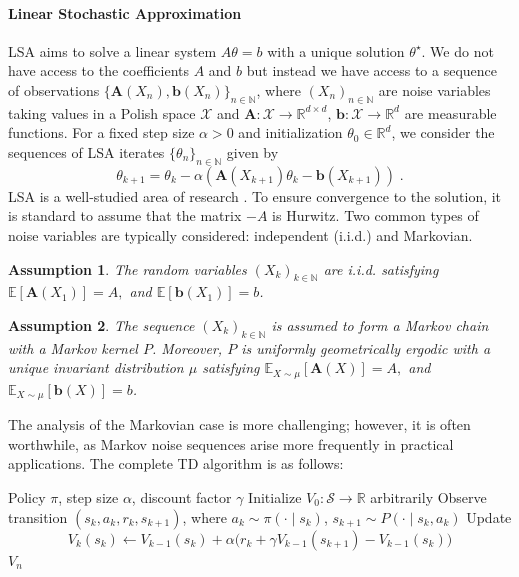 \documentclass{article}
\numberwithin{equation}{section}
\newtheorem{assumption}{Assumption}
\newcommand{\bA}{\mathbf{A}}
\newcommand{\bb}{\mathbf{b}}
\newcommand{\eqsp}{\;}
\begin{document}
\paragraph{Linear Stochastic Approximation} LSA aims to solve a linear system \(A\theta = b\) with a unique
solution \(\theta^\star\). We do not have access to the coefficients \(A\) and \(b\) but instead we have access to a sequence of observations \(\{\bA(X_n), \bb(X_n)\}_{n\in\mathbb{N}}\), where \((X_n)_{n\in\mathbb{N}}\) are noise variables taking values in a Polish space \(\mathcal{X}\) and \(\bA  : \mathcal{X}\rightarrow \mathbb{R}^{d\times d}\), \(\bb : \mathcal{X}\rightarrow \mathbb{R}^{d}\)
are measurable functions. For a fixed step size \(\alpha>0\) and initialization \(\theta_0\in \mathbb{R}^d\), we consider the
sequences of LSA iterates \(\{\theta_n\}_{n\in\mathbb{N}}\) given by
\begin{equation}
    \theta_{k+1} = \theta_{k} - \alpha (\bA(X_{k+1})\theta_{k} - \bb(X_{k+1}))\eqsp.
\end{equation}
LSA is a well-studied area of research \cite{ durmus2021tight, samsonov2026statistical, durmus2025finite}. To ensure convergence to the solution, it is standard to assume that the matrix $-A$ is Hurwitz. Two common types of noise variables are typically considered: independent (i.i.d.) and Markovian.
\begin{assumption}
The random variables \((X_k)_{k \in \mathbb{N}}\) are i.i.d. satisfying  \(\mathbb{E}[\bA(X_1)] = A,\) and  \(\mathbb{E}[\bb(X_1)] = {b}\).
\end{assumption}
\begin{assumption}
    The sequence $(X_k)_{k \in \mathbb{N}}$ is assumed to form a Markov chain with a Markov kernel $P$. Moreover, $P$ is uniformly geometrically ergodic with a unique invariant distribution $\mu$ satisfying \(\mathbb{E}_{X\sim\mu}[\bA(X)] = A,\) and  \(\mathbb{E}_{X\sim\mu}[\bb(X)] = {b}\).
\end{assumption}
The analysis of the Markovian case is more challenging; however, it is often worthwhile, as Markov noise sequences arise more frequently in practical applications. The complete TD algorithm is as follows:
\begin{algorithm}[H]
\caption{TD(0)}
\label{alg:td}
\begin{algorithmic}[1]
    \REQUIRE Policy \(\pi\), step size \(\alpha\), discount factor \(\gamma\)
    \STATE Initialize \(V_0 : \mathcal{S} \to \mathbb{R}\) arbitrarily
        \STATE Observe transition \( (s_k,a_k,r_k,s_{k+1}) \), where 
        \(a_k \sim \pi(\cdot \mid s_k)\), \(s_{k+1} \sim P(\cdot \mid s_k,a_k)\)
        \STATE Update
        \[
        V_k(s_k)
        \gets
        V_{k-1}(s_k)
        +
        \alpha\bigl(
        r_k + \gamma V_{k-1}(s_{k+1}) - V_{k-1}(s_k)
        \bigr)
        \]
    \ENDFOR
    \RETURN \(V_n\)
\end{algorithmic}
\end{algorithm}
\end{document}
